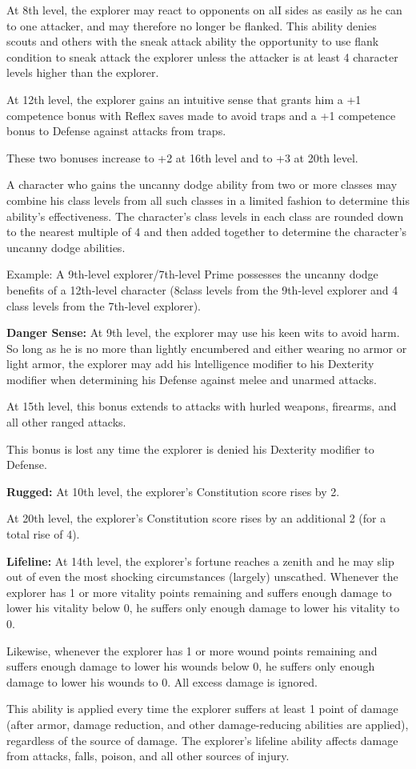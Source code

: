 At 8th level, the explorer may react to opponents on alI sides as easily as he can to one attacker, and may therefore no longer be flanked. This ability denies scouts and others with the sneak attack ability the opportunity to use flank condition to sneak attack the explorer unless the attacker is at least 4 character levels higher than the explorer.

At 12th level, the explorer gains an intuitive sense that grants him a +1 competence bonus with Reflex saves made to avoid traps and a +1 competence bonus to Defense against attacks from traps.

These two bonuses increase to +2 at 16th level and to +3 at 20th level.

A character who gains the uncanny dodge ability from two or more classes may combine his class levels from all such classes in a limited fashion to determine this ability's effectiveness. The character's class levels in each class are rounded down to the nearest multiple of 4 and then added together to determine the character's uncanny dodge abilities.

Example: A 9th-level explorer/7th-level Prime possesses the uncanny dodge benefits of a 12th-level character (8class levels from the 9th-level explorer and 4 class levels from the 7th-level explorer).

\textbf{Danger Sense:} At 9th level, the explorer may use his keen wits to avoid harm. So long as he is no more than lightly encumbered and either wearing no armor or light armor, the explorer may add his lntelligence modifier to his Dexterity modifier when determining his Defense against melee and unarmed attacks.

At 15th level, this bonus extends to attacks with hurled weapons, firearms, and all other ranged attacks.

This bonus is lost any time the explorer is denied his Dexterity modifier to Defense.

\textbf{Rugged:} At 10th level, the explorer's Constitution score rises by 2.

At 20th level, the explorer's Constitution score rises by an additional 2 (for a total rise of 4).

\textbf{Lifeline:} At 14th level, the explorer's fortune reaches a zenith and he may slip out of even the most shocking circumstances (largely) unscathed. Whenever the explorer has 1 or more vitality points remaining and suffers enough damage to lower his vitality below 0, he suffers only enough damage to lower his vitality to 0.

Likewise, whenever the explorer has 1 or more wound points remaining and suffers enough damage to lower his wounds below 0, he suffers only enough damage to lower his wounds to 0. All excess damage is ignored.

This ability is applied every time the explorer suffers at least 1 point of damage (after armor, damage reduction, and other damage-reducing abilities are applied), regardless of the source of damage. The explorer's lifeline ability affects damage from attacks, falls, poison, and all other sources of injury.